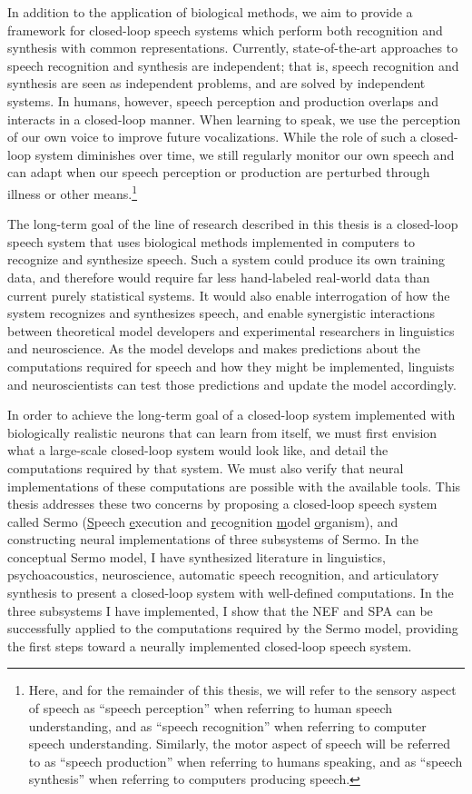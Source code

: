 In addition to the application of biological methods,
we aim to provide a framework for
closed-loop speech systems
which perform both recognition and synthesis
with common representations.
Currently, state-of-the-art approaches
to speech recognition and synthesis
are independent;
that is, speech recognition and synthesis
are seen as independent problems,
and are solved by independent systems.
In humans, however,
speech perception and production
overlaps and interacts in a closed-loop manner.
When learning to speak,
we use the perception of our own voice
to improve future vocalizations.
While the role of such a closed-loop system
diminishes over time,
we still regularly monitor
our own speech and can adapt
when our speech perception or production
are perturbed through illness
or other means.\footnote{
  Here, and for the remainder of this thesis,
  we will refer to the sensory aspect
  of speech as ``speech perception''
  when referring to human speech understanding,
  and as ``speech recognition''
  when referring to computer speech understanding.
  Similarly, the motor aspect of speech
  will be referred to as
  ``speech production''
  when referring to humans speaking,
  and as ``speech synthesis''
  when referring to computers producing speech.}

The long-term goal of the line of research
described in this thesis
is a closed-loop speech system
that uses biological methods
implemented in computers
to recognize and synthesize speech.
Such a system could produce its own training data,
and therefore would require
far less hand-labeled real-world data than
current purely statistical systems.
It would also enable interrogation
of how the system recognizes
and synthesizes speech,
and enable synergistic interactions
between theoretical model developers
and experimental researchers
in linguistics and neuroscience.
As the model develops and makes predictions
about the computations required for speech
and how they might be implemented,
linguists and neuroscientists
can test those predictions
and update the model accordingly.

In order to achieve the long-term goal
of a closed-loop system
implemented with biologically realistic neurons
that can learn from itself,
we must first
envision what a large-scale closed-loop system
would look like,
and detail the computations required by that system.
We must also verify that neural implementations
of these computations
are possible with the available tools.
This thesis addresses these two concerns
by proposing a closed-loop speech system
called Sermo
(\underline{S}peech \underline{e}xecution and
\underline{r}ecognition \underline{m}odel \underline{o}rganism),
and constructing neural implementations
of three subsystems of Sermo.
In the conceptual Sermo model,
I have synthesized literature
in linguistics, psychoacoustics, neuroscience,
automatic speech recognition,
and articulatory synthesis
to present a closed-loop system
with well-defined computations.
In the three subsystems I have implemented,
I show that the NEF and SPA
can be successfully applied to
the computations required by the Sermo model,
providing the first steps
toward a neurally implemented closed-loop speech system.

